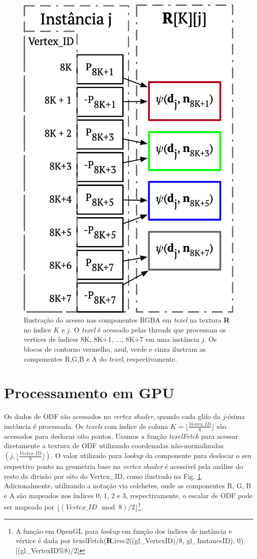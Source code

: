 \begin{figure}[ht]
    \centering
    \includegraphics[width=.45\linewidth, angle=0]{figs/Esquema_Glifo/texellookup.png}
    \caption{Ilustração do acesso nas componentes RGBA em \textit{texel} na textura \textbf{R} no índice $K$ e $j$. O \textit{texel} é acessado pelas threads que processam os vertices de índices 8K, 8K+1, ..., 8K+7 em uma instância $j$. Os blocos de contorno vermelho, azul, verde e cinza ilustram as componentes R,G,B e A do \textit{texel}, respectivamente.}
    \label{fig::texelfetch}
\end{figure}

\section{Processamento em GPU}
\label{sec:glifos_gpu}


Os dados de ODF são acessados no \textit{vertex shader}, quando cada glifo da $j$-ésima instância é processada. Os \textit{texels} com índice de coluna $K = \lfloor\frac{Vertex\_ID}{8} \rfloor$ são acessados para deslocar oito pontos. Usamos a função \textit{texelFetch} para acessar diretamente a textura de ODF utilizando coordenadas não-normalizadas $(j, \lfloor\frac{Vertex\_ID}{8} \rfloor)$. O valor utilizado para \textit{lookup} da componente  para deslocar o seu respectivo ponto na geometria base no \textit{vertex shader} é acessível pela análise do resto da divisão por oito do Vertex\_ID, como ilustrado na Fig. \ref{fig::texelfetch}. Adicionalmente, utilizando a notação via colchetes, onde as componentes R, G, B e A são mapeados nos índices 0, 1, 2 e 3, respectivamente, o escalar de ODF pode ser mapeado por $\lfloor (Vertex\_ID \mod{8})/2 \rfloor$\footnote{A função em OpenGL para \textit{lookup} em função dos índices de instância e vértice é dada por texelFetch($\mathbf{R}$,ivec2((gl\_VertexID)/8, gl\_InstanceID), 0)[(gl\_VertexID\%8)/2]}.



